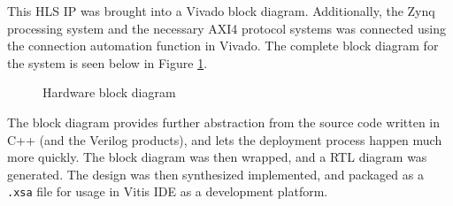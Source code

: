 \documentclass[11pt]{report}
\begin{document}
This HLS IP was brought into a Vivado block diagram. Additionally, the Zynq processing system and the necessary AXI4 protocol systems was connected using the connection automation function in Vivado. The complete block diagram for the system is seen below in Figure \ref{fig:BD}.

\begin{figure}[h!]
 	\begin{center}
 		\fboxsep=0mm
 		\caption{Hardware block diagram}
 		\label{fig:BD}
 	\end{center}
 \end{figure}
 \FloatBarrier
 
 The block diagram provides further abstraction from the source code written in C++ (and the Verilog products), and lets the deployment process happen much more quickly. The block diagram was then wrapped, and a RTL diagram was generated. The design was then synthesized implemented, and packaged as a \texttt{.xsa} file for usage in Vitis IDE as a development platform. 
 
\end{document}
